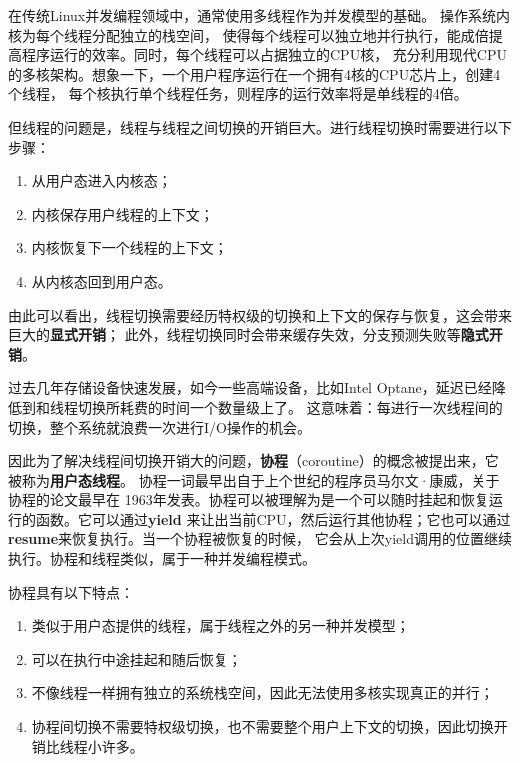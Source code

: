 \documentclass[supercite]{HustGraduPaper}
\theoremstyle{definition}
\begin{document}

在传统Linux并发编程领域中，通常使用多线程\cite{nemirovsky2013multithreading}作为并发模型的基础。
操作系统内核为每个线程分配独立的栈空间，
使得每个线程可以独立地并行执行，能成倍提高程序运行的效率。同时，每个线程可以占据独立的CPU核，
充分利用现代CPU的多核架构\cite{hong2011efficient}。想象一下，一个用户程序运行在一个拥有4核的CPU芯片上，创建4个线程，
每个核执行单个线程任务，则程序的运行效率将是单线程的4倍。\par

但线程的问题是，线程与线程之间切换的开销巨大\cite{david2007context}。进行线程切换时需要进行以下步骤：

\begin{enumerate}[label={(\arabic*)}]
  \item 从用户态进入内核态；
  \item 内核保存用户线程的上下文；
  \item 内核恢复下一个线程的上下文；
  \item 从内核态回到用户态。
\end{enumerate}

由此可以看出，线程切换需要经历特权级的切换和上下文的保存与恢复，这会带来巨大的\textbf{显式开销}；
此外，线程切换同时会带来缓存失效，分支预测\cite{smith1998study}失败等\textbf{隐式开销}。\par

过去几年存储设备快速发展，如今一些高端设备，比如Intel Optane\cite{izraelevitz2019basic}，延迟已经降低到和线程切换所耗费的时间一个数量级上了。
这意味着：每进行一次线程间的切换，整个系统就浪费一次进行I/O操作的机会。\par

因此为了解决线程间切换开销大的问题，\textbf{协程}（coroutine）的概念被提出来，它被称为\textbf{用户态线程}。
协程一词最早出自于上个世纪的程序员马尔文·康威，关于协程的论文\cite{paper1}最早在
1963年发表。协程可以被理解为是一个可以随时挂起和恢复运行的函数。它可以通过\textbf{yield}
来让出当前CPU，然后运行其他协程；它也可以通过\textbf{resume}来恢复执行。当一个协程被恢复的时候，
它会从上次yield调用的位置继续执行。协程和线程类似，属于一种并发编程模式。\par

协程具有以下特点：

\begin{enumerate}[label={(\arabic*)}]
  \item 类似于用户态提供的线程，属于线程之外的另一种并发模型；
  \item 可以在执行中途挂起和随后恢复；
  \item 不像线程一样拥有独立的系统栈空间，因此无法使用多核实现真正的并行；
  \item 协程间切换不需要特权级切换，也不需要整个用户上下文的切换，因此切换开销比线程小许多。
\end{enumerate}
\end{document}
